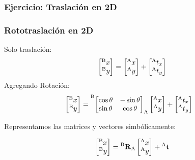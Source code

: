 \begin{frame}
    \frametitle{Ejercicio: Traslación en 2D}
\end{frame}

\begin{frame}
    \frametitle{Rototraslación en 2D}
\scriptsize
Solo traslación:
    \begin{equation*}
        \begin{bmatrix}
            \toCoord{x}{B}\\
            \toCoord{y}{B}
        \end{bmatrix} =
        \begin{bmatrix}
            \toCoord{x}{A}\\
            \toCoord{y}{A}
        \end{bmatrix} +
        \begin{bmatrix}
            \toCoord{t_{x}}{A}\\
            \toCoord{t_{y}}{A}
        \end{bmatrix}
    \end{equation*}
Agregando Rotación:
    \begin{align*}
        \begin{bmatrix}
            \toCoord{x}{B}\\
            \toCoord{y}{B}
        \end{bmatrix} &=
       \toCoord{\fromCoord{\begin{bmatrix}
                                \cos \theta & -\sin \theta \\
                                \sin \theta & \cos \theta
                            \end{bmatrix}}{A}}{B}
        \begin{bmatrix}
            \toCoord{x}{A}\\
            \toCoord{y}{A}
        \end{bmatrix} +
        \begin{bmatrix}
            \toCoord{t_{x}}{A}\\
            \toCoord{t_{y}}{A}
        \end{bmatrix}
    \end{align*}

Representamos las matrices y vectores simbólicamente:

    \begin{equation*}
        \begin{bmatrix}
            \toCoord{x}{B}\\
            \toCoord{y}{B}\\
        \end{bmatrix} = \rotationCoord{B}{A}
        \begin{bmatrix}
            \toCoord{x}{A}\\
            \toCoord{y}{A}
        \end{bmatrix} + \toCoord{\translation}{A}
    \end{equation*}



\end{frame}
